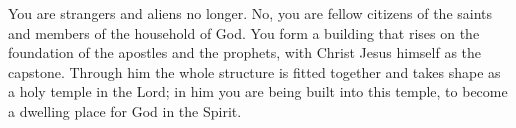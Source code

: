 
\lettrine{Y}{}ou are strangers and aliens no longer. No, you are fellow citizens of the saints and members of the household of God. You form a building that rises on the foundation of the apostles and the prophets, with Christ Jesus himself as the capstone. Through him the whole structure is fitted together and takes shape as a holy temple in the Lord; in him you are being built into this temple, to become a dwelling place for God in the Spirit.